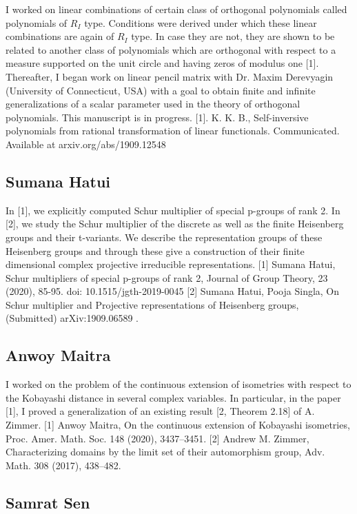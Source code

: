 I worked on linear combinations of certain class of orthogonal polynomials called polynomials of $R_I$ type. Conditions were derived under which these linear combinations are again of $R_I$ type. In case they are not, they are shown to be related to another class of polynomials which are orthogonal with respect to a measure supported on the unit circle and having zeros of modulus one [1].  Thereafter, I began work on linear pencil matrix with Dr. Maxim Derevyagin  (University of Connecticut, USA) with a goal to obtain finite and infinite generalizations of a scalar parameter used in the theory of orthogonal polynomials. This manuscript is in progress.  [1]. K. K. B., Self-inversive polynomials from rational transformation of linear         functionals. Communicated. Available at arxiv.org/abs/1909.12548


\subsection{Sumana Hatui}

In [1], we explicitly computed Schur multiplier of special p-groups of rank 2. In [2], we study the Schur multiplier of the discrete as well as the finite Heisenberg groups and their t-variants. We describe the representation groups of these Heisenberg groups and through these give a construction of their finite dimensional complex projective irreducible representations.   [1] Sumana Hatui, Schur multipliers of special p-groups of rank 2, Journal of Group Theory, 23 (2020), 85-95. doi: 10.1515/jgth-2019-0045 [2] Sumana Hatui, Pooja Singla, On Schur multiplier and Projective representations of Heisenberg groups, (Submitted) arXiv:1909.06589 .


\subsection{Anwoy Maitra}

I worked on the problem of the continuous extension of isometries with respect to the Kobayashi distance in several complex variables. In particular, in the paper [1], I proved a generalization of an existing result [2, Theorem 2.18] of A. Zimmer. [1] Anwoy Maitra, On the continuous extension of Kobayashi isometries, Proc. Amer. Math. Soc. 148 (2020), 3437--3451. [2] Andrew M. Zimmer, Characterizing domains by the limit set of their automorphism group, Adv. Math. 308 (2017), 438--482.


\subsection{Samrat Sen}

